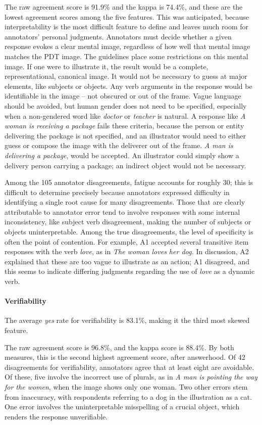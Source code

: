 \documentclass[11pt,a4paper]{article}
\begin{document}
The raw agreement score is 91.9\% and the kappa is 74.4\%, and these are the lowest agreement scores among the five features. This was anticipated, because interpretability is the most difficult feature to define and leaves much room for annotators' personal judgments. Annotators must decide whether a given response evokes a clear mental image, regardless of how well that mental image matches the PDT image. The guidelines place some restrictions on this mental image. If one were to illustrate it, the result would be a complete, representational, canonical image. It would not be necessary to guess at major elements, like subjects or objects. Any verb arguments in the response would be identifiable in the image -- not obscured or out of the frame. Vague language should be avoided, but human gender does not need to be specified, especially when a non-gendered word like \textit{doctor} or \textit{teacher} is natural. A response like \textit{A woman is receiving a package} fails these criteria, because the person or entity delivering the package is not specified, and an illustrator would need to either guess or compose the image with the deliverer out of the frame. \textit{A man is delivering a package}, would be accepted. An illustrator could simply show a delivery person carrying a package; an indirect object would not be necessary.

Among the 105 annotator disagreements, fatigue accounts for roughly 30; this is difficult to determine precisely because annotators expressed difficulty in identifying a single root cause for many disagreements. Those that are clearly attributable to annotator error tend to involve responses with some internal inconsistency, like subject verb disagreement, making the number of subjects or objects uninterpretable. Among the true disagreements, the level of specificity is often the point of contention. For example, A1 accepted several transitive item responses with the verb \textit{love}, as in \textit{The woman loves her dog.} In discussion, A2 explained that these are too vague to illustrate as an action; A1 disagreed, and this seems to indicate differing judgments regarding the use of \textit{love} as a dynamic verb.

\paragraph{Verifiability} The average \textit{yes} rate for verifiability is 83.1\%, making it the third most skewed feature.

The raw agreement score is 96.8\%, and the kappa score is 88.4\%. By both measures, this is the second highest agreement score, after answerhood. Of 42 disagreements for verifiability, annotators agree that at least eight are avoidable. Of these, five involve the incorrect use of plurals, as in \textit{A man is pointing the way for the women}, when the image shows only one woman. Two other errors stem from inaccuracy, with respondents referring to a dog in the illustration as a cat. One error involves the uninterpretable misspelling of a crucial object, which renders the response unverifiable.
\end{document}
